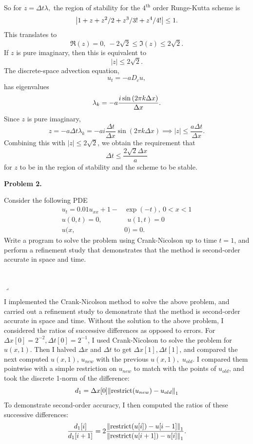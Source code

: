 \documentclass[12pt]{article}
\newenvironment{myprob}[1]
    {%
    \noindent{\Huge$\ulcorner$}\textbf{#1.}\begin{em}
    }
    { 
    \end{em} \\ \hphantom{l} \hfill {\Huge$\lrcorner$} }
\begin{document}
So for $z = \Delta t \lambda,$ the region of stability for the $4^{\text{th}}$ order Runge-Kutta scheme is
$$\abs{1 + z + z^2/2 + z^3/3! + z^4/4!} \leq 1.$$
This translates to $$\Re(z)=0,\  -2\sqrt{2} \leq \Im(z) \leq 2\sqrt{2}.$$
If $z$ is pure imaginary, then this is equivalent to $$|z| \leq 2\sqrt{2}.$$
The discrete-space advection equation, 
$$u_t = -a D_c u,$$
has eigenvalues $$\lambda_k = -a\dfrac{i\sin\qty(2\pi k \Delta x)}{\Delta x}.$$
Since $z$ is pure imaginary, $$z = -a\Delta t \lambda_k =  -a i\dfrac{\Delta t}{\Delta x} \sin(2 \pi k \Delta x) \implies |z| \leq \dfrac{a\Delta t}{\Delta x}.$$
Combining this with $|z|\leq 2\sqrt{2}$, we obtain the requirement that 
$$ \Delta t \leq \dfrac{2 \sqrt{2} \Delta x}{a}$$
for $z$ to be in the region of stability and the scheme to be stable.\\
\newpage

\begin{myprob}{Problem 2}
Consider the following PDE
\begin{align*}
u_t = 0.01 u_{xx} + 1 - &\exp(-t), \ 0<x<1 \\
u(0,t)=0, &\ \ u(1,t)=0 \\
u(x,&0) = 0.
\end{align*}
Write a program to solve the problem using Crank-Nicolson up to time $t=1$, and perform a refinement study that demonstrates that the method is second-order accurate in space and time.
\end{myprob}

I implemented the Crank-Nicolson method to solve the above problem, and carried out a refinement study to demonstrate that the method is second-order accurate in space and time.  Without the solution to the above problem, I considered the ratios of successive differences as opposed to errors.  For $\Delta x[0]=2^{-2}, \Delta t[0]=2^{-1}$, I used Crank-Nicolson to solve the problem for $u(x,1)$.  Then I halved $\Delta x$ and $\Delta t$ to get $\Delta x[1], \Delta t[1]$, and compared the next computed $u(x,1)$, $u_{new}$ with the previous $u(x,1),$ $u_{old}$.  I compared them pointwise with a simple restriction on $u_{new}$ to match with the points of $u_{old}$, and took the discrete 1-norm of the difference:
$$d_1 = \Delta x[0] \norm{\text{restrict}(u_{new})-u_{old}}_1 $$
To demonstrate second-order accuracy, I then computed the ratios of these successive differences:
$$\dfrac{d_1[i]}{d_1[i+1]} = 2 \dfrac{\norm{\text{restrict}(u[i])-u[i-1]}_1 }{\norm{\text{restrict}(u[i+1])-u[i]}_1 }.$$
\end{document}
